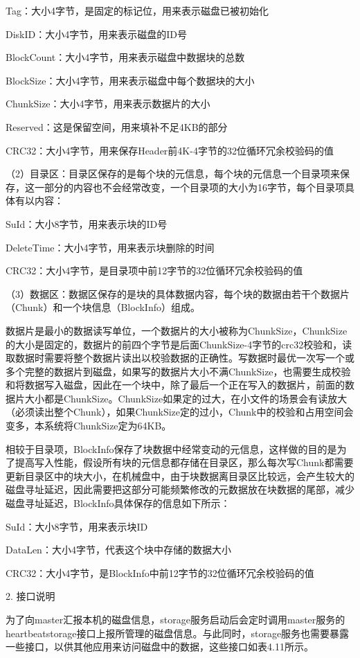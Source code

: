Tag：大小4字节，是固定的标记位，用来表示磁盘已被初始化

DiskID：大小4字节，用来表示磁盘的ID号

BlockCount：大小4字节，用来表示磁盘中数据块的总数

BlockSize：大小4字节，用来表示磁盘中每个数据块的大小

ChunkSize：大小4字节，用来表示数据片的大小

Reserved：这是保留空间，用来填补不足4KB的部分

CRC32：大小4字节，用来保存Header前4K-4字节的32位循环冗余校验码的值

（2）目录区：目录区保存的是每个块的元信息，每个块的元信息一个目录项来保存，这一部分的内容也不会经常改变，一个目录项的大小为16字节，每个目录项具体有以内容：

SuId：大小8字节，用来表示块的ID号

DeleteTime：大小4字节，用来表示块删除的时间

CRC32：大小4字节，是目录项中前12字节的32位循环冗余校验码的值

（3）数据区：数据区保存的是块的具体数据内容，每个块的数据由若干个数据片（Chunk）和一个块信息（BlockInfo）组成。

数据片是最小的数据读写单位，一个数据片的大小被称为ChunkSize，ChunkSize的大小是固定的，数据片的前四个字节是后面ChunkSize-4字节的crc32校验和，读取数据时需要将整个数据片读出以校验数据的正确性。写数据时最优一次写一个或多个完整的数据片到磁盘，如果写的数据片大小不满ChunkSize，也需要生成校验和将数据写入磁盘，因此在一个块中，除了最后一个正在写入的数据片，前面的数据片大小都是ChunkSize。ChunkSize如果定的过大，在小文件的场景会有读放大（必须读出整个Chunk），如果ChunkSize定的过小，Chunk中的校验和占用空间会变多，本系统将ChunkSize定为64KB。

相较于目录项，BlockInfo保存了块数据中经常变动的元信息，这样做的目的是为了提高写入性能，假设所有块的元信息都存储在目录区，那么每次写Chunk都需要更新目录区中的块大小，在机械盘中，由于块数据离目录区比较远，会产生较大的磁盘寻址延迟，因此需要把这部分可能频繁修改的元数据放在块数据的尾部，减少磁盘寻址延迟，BlockInfo具体保存的信息如下所示：

SuId：大小8字节，用来表示块ID

DataLen：大小4字节，代表这个块中存储的数据大小

CRC32：大小4字节，是BlockInfo中前12字节的32位循环冗余校验码的值

2. 接口说明

为了向master汇报本机的磁盘信息，storage服务启动后会定时调用master服务的heartbeatstorage接口上报所管理的磁盘信息。与此同时，storage服务也需要暴露一些接口，以供其他应用来访问磁盘中的数据，这些接口如表4.11所示。


